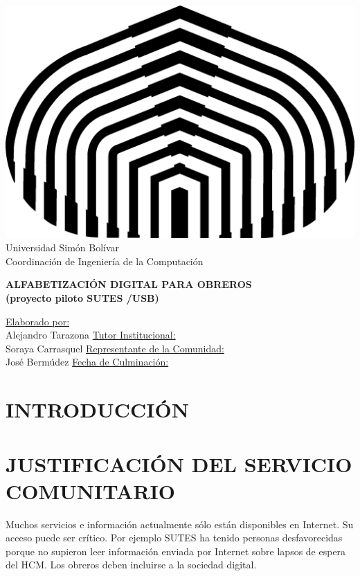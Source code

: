 \documentclass[letterpaper,12pt]{article}
\begin{document}
	
	\begin{center}
		\includegraphics{./img/logo.png} \\
		Universidad Simón Bolívar \\
		Coordinación de Ingeniería de la Computación
        
		\vfill
		{\LARGE \textbf{ALFABETIZACIÓN DIGITAL PARA OBREROS \\ (proyecto piloto SUTES /USB)} }
		\vfill
        
        
		\underline{Elaborado por:}\\
		Alejandro Tarazona
        \linebreak
        \linebreak
		\underline{Tutor Institucional:}\\
		Soraya Carrasquel
        \linebreak
        \linebreak
		\underline{Representante de la Comunidad:}\\
		José Bermúdez
		\linebreak
        \linebreak
        \linebreak
		\underline{Fecha de Culminación:}\\
		
	\end{center}
	\pagebreak
    
	\tableofcontents
	\pagebreak
	
	\section{INTRODUCCIÓN}
	\pagebreak
	
	\section{JUSTIFICACIÓN DEL SERVICIO\\ COMUNITARIO}
		Muchos servicios e información actualmente sólo están disponibles en Internet. Su acceso puede ser crítico. Por ejemplo SUTES ha tenido personas desfavorecidas porque no supieron leer información enviada por Internet sobre lapsos de espera del HCM. Los obreros deben incluirse a la sociedad digital.
        
\end{document}
